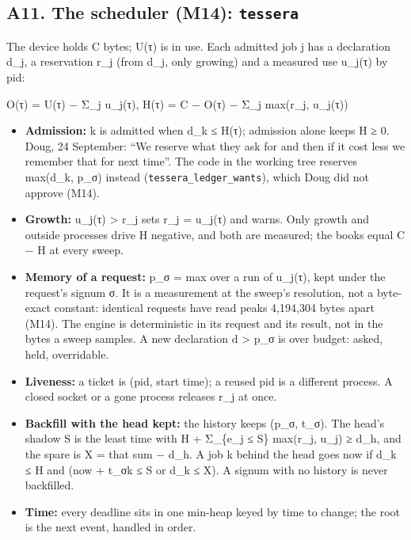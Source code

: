 \subsection{\texorpdfstring{A11. The scheduler (M14): \texttt{tessera}}{A11. The scheduler (M14): tessera}}

The device holds C bytes; U(τ) is in use. Each admitted job j has a declaration d\_\allowbreak{}j, a reservation r\_\allowbreak{}j (from d\_\allowbreak{}j, only growing) and a measured use u\_\allowbreak{}j(τ) by pid:

O(τ) = U(τ) − Σ\_\allowbreak{}j u\_\allowbreak{}j(τ),  H(τ) = C − O(τ) − Σ\_\allowbreak{}j max(r\_\allowbreak{}j, u\_\allowbreak{}j(τ))

\begin{itemize}
\item \textbf{Admission:} k is admitted when d\_\allowbreak{}k ≤ H(τ); admission alone keeps H ≥ 0. Doug, 24 September: “We reserve what they ask for and then if it cost less we remember that for next time”. The code in the working tree reserves max(d\_\allowbreak{}k, p\_\allowbreak{}σ) instead (\texttt{tessera\_\allowbreak{}ledger\_\allowbreak{}wants}), which Doug did not approve (M14).
\item \textbf{Growth:} u\_\allowbreak{}j(τ) > r\_\allowbreak{}j sets r\_\allowbreak{}j = u\_\allowbreak{}j(τ) and warns. Only growth and outside processes drive H negative, and both are measured; the books equal C − H at every sweep.
\item \textbf{Memory of a request:} p\_\allowbreak{}σ = max over a run of u\_\allowbreak{}j(τ), kept under the request's signum σ. It is a measurement at the sweep's resolution, not a byte-exact constant: identical requests have read peaks 4,194,304 bytes apart (M14). The engine is deterministic in its request and its result, not in the bytes a sweep samples. A new declaration d > p\_\allowbreak{}σ is over budget: asked, held, overridable.
\item \textbf{Liveness:} a ticket is (pid, start time); a reused pid is a different process. A closed socket or a gone process releases r\_\allowbreak{}j at once.
\item \textbf{Backfill with the head kept:} the history keeps (p\_\allowbreak{}σ, t\_\allowbreak{}σ). The head's shadow S is the least time with H + Σ\_\allowbreak{}\{e\_\allowbreak{}j ≤ S\} max(r\_\allowbreak{}j, u\_\allowbreak{}j) ≥ d\_\allowbreak{}h, and the spare is X = that sum − d\_\allowbreak{}h. A job k behind the head goes now if d\_\allowbreak{}k ≤ H and (now + t\_\allowbreak{}σk ≤ S or d\_\allowbreak{}k ≤ X). A signum with no history is never backfilled.
\item \textbf{Time:} every deadline sits in one min-heap keyed by time to change; the root is the next event, handled in order.
\end{itemize}

